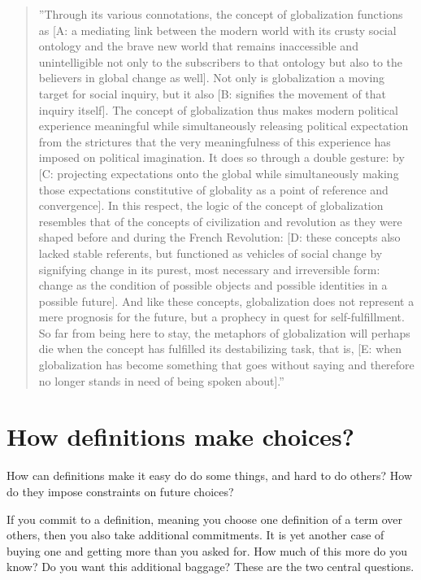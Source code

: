 \begin{quote}
''Through its various connotations, the concept of globalization functions as [A: a mediating link between the modern world with its crusty social ontology and the brave new world that remains inaccessible and unintelligible not only to the subscribers to that ontology but also to the believers in global change as well]. Not only is globalization a moving target for social inquiry, but it also [B: signifies the movement of that inquiry itself]. The concept of globalization thus makes modern political experience meaningful while simultaneously releasing political expectation from the strictures that the very meaningfulness of this experience has imposed on political imagination. It does so through a double gesture: by [C: projecting expectations onto the global while simultaneously making those expectations constitutive of globality as a point of reference and convergence]. In this respect, the logic of the concept of globalization resembles that of the concepts of civilization and revolution as they were shaped before and during the French Revolution: [D: these concepts also lacked stable referents, but functioned as vehicles of social change by signifying change in its purest, most necessary and irreversible form: change as the condition of possible objects and possible identities in a possible future]. And like these concepts, globalization does not represent a mere prognosis for the future, but a prophecy in quest for self-fulfillment. So far from being here to stay, the metaphors of globalization will perhaps die when the concept has fulfilled its destabilizing task, that is, [E: when globalization has become something that goes without saying and therefore no longer stands in need of being spoken about].'' \cite{bartelson2000three}
\end{quote}


\section{How definitions make choices?}
\label{c6:s4}
How can definitions make it easy do do some things, and hard to do others? How do they impose constraints on future choices?

If you commit to a definition, meaning you choose one definition of a term over others, then you also take additional commitments. It is yet another case of buying one and getting more than you asked for. How much of this more do you know? Do you want this additional baggage? These are the two central questions.

